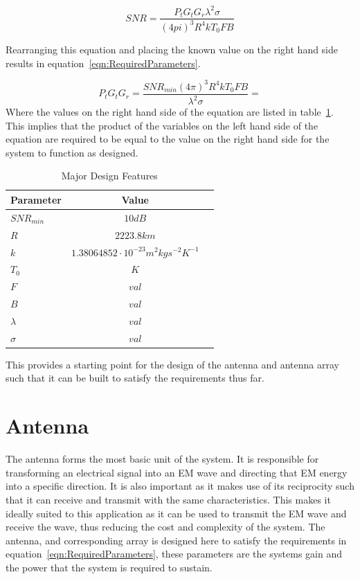 \documentclass[11pt]{witseiepaper}
\begin{document}
\begin{equation} \label{eqn:SNR}
SNR = \frac{P_{t} G_{t} G_{r} \lambda^2 \sigma}{(4 pi)^3 R^4 k T_0 F B}
\end{equation}


Rearranging this equation and placing the known value on the right hand side results in equation~\ref{eqn:RequiredParameters}.

\begin{equation} \label{eqn:RequiredParameters}
P_{t} G_{t} G_{r} = \frac{SNR_{min} (4 \pi )^3 R^4 k T_{0} F B}{{\lambda}^2 \sigma} = 
\end{equation}
Where the values on the right hand side of the equation are listed in table~\ref{tab:DesignValues}.
This implies that the product of the variables on the left hand side of the equation are required to be equal to the value on the right hand side for the system to function as designed.

\begin{table}[htb]
    \caption{Major Design Features}
    \label{tab:DesignValues}
    \begin{center}
        \begin{tabular}{p{70mm}cp{70mm}}
            \hline 
            Parameter & Value \\
            \hline
            $SNR_{min}$ & $10 dB$ \\
            $R$ & $2223.8 km$ \\
            $k$ & $1.38064852 \cdot 10^{-23} m^2 kg s^{-2} K^{-1}$ \\
            $T_{0}$ & $K$ \\
            $F$ & $val$ \\
            $B$ & $val$ \\
            $\lambda$ & $val$ \\
            $\sigma$ & $val$ \\
            \hline
        \end{tabular}
    \end{center}
\end{table}


This provides a starting point for the design of the antenna and antenna array such that it can be built to satisfy the requirements thus far.

\section{Antenna} \label{sec:Antenna}
The antenna forms the most basic unit of the system. It is responsible for transforming an electrical signal into an EM wave and directing that EM energy into a specific direction. It is also important as it makes use of its reciprocity such that it can receive and transmit with the same characteristics. This makes it ideally suited to this application as it can be used to transmit the EM wave and receive the wave, thus reducing the cost and complexity of the system.
The antenna, and corresponding array is designed here to satisfy the requirements in equation~\ref{eqn:RequiredParameters}, these parameters are the systems gain and the power that the system is required to sustain.
\end{document}

